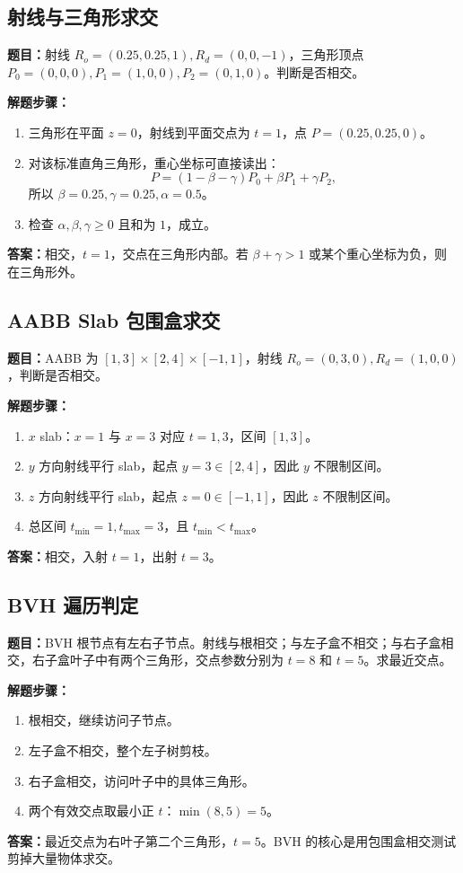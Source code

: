 \documentclass[UTF8,zihao=-4,scheme=chinese,fontset=fandol]{ctexart}
\begin{document}
\subsection{射线与三角形求交}
\textbf{题目：}射线 $R_o=(0.25,0.25,1),R_d=(0,0,-1)$，三角形顶点 $P_0=(0,0,0),P_1=(1,0,0),P_2=(0,1,0)$。判断是否相交。

\textbf{解题步骤：}
\begin{enumerate}
  \item 三角形在平面 $z=0$，射线到平面交点为 $t=1$，点 $P=(0.25,0.25,0)$。
  \item 对该标准直角三角形，重心坐标可直接读出：
  \[
  P=(1-\beta-\gamma)P_0+\beta P_1+\gamma P_2,
  \]
  所以 $\beta=0.25,\gamma=0.25,\alpha=0.5$。
  \item 检查 $\alpha,\beta,\gamma\ge0$ 且和为 $1$，成立。
\end{enumerate}
\textbf{答案：}相交，$t=1$，交点在三角形内部。若 $\beta+\gamma>1$ 或某个重心坐标为负，则在三角形外。

\subsection{AABB Slab 包围盒求交}
\textbf{题目：}AABB 为 $[1,3]\times[2,4]\times[-1,1]$，射线 $R_o=(0,3,0),R_d=(1,0,0)$，判断是否相交。

\textbf{解题步骤：}
\begin{enumerate}
  \item $x$ slab：$x=1$ 与 $x=3$ 对应 $t=1,3$，区间 $[1,3]$。
  \item $y$ 方向射线平行 slab，起点 $y=3\in[2,4]$，因此 $y$ 不限制区间。
  \item $z$ 方向射线平行 slab，起点 $z=0\in[-1,1]$，因此 $z$ 不限制区间。
  \item 总区间 $t_{\min}=1,t_{\max}=3$，且 $t_{\min}<t_{\max}$。
\end{enumerate}
\textbf{答案：}相交，入射 $t=1$，出射 $t=3$。

\subsection{BVH 遍历判定}
\textbf{题目：}BVH 根节点有左右子节点。射线与根相交；与左子盒不相交；与右子盒相交，右子盒叶子中有两个三角形，交点参数分别为 $t=8$ 和 $t=5$。求最近交点。

\textbf{解题步骤：}
\begin{enumerate}
  \item 根相交，继续访问子节点。
  \item 左子盒不相交，整个左子树剪枝。
  \item 右子盒相交，访问叶子中的具体三角形。
  \item 两个有效交点取最小正 $t$：$\min(8,5)=5$。
\end{enumerate}
\textbf{答案：}最近交点为右叶子第二个三角形，$t=5$。BVH 的核心是用包围盒相交测试剪掉大量物体求交。
\end{document}
